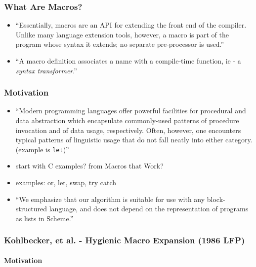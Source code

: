 \documentclass[12pt]{article}	%
\begin{document}
\subsubsection*{What Are Macros?}
\begin{itemize}
	\item ``Essentially, macros are an API for extending the front end of the compiler. Unlike many language extension tools, however, a macro is part of the program whose syntax it extends; no separate pre-processor is used.''~\cite[p1]{Culpepper2010Fortifying}
	\item ``A macro definition associates a name with a compile-time function, ie - a \emph{syntax transformer}.''~\cite[p1]{Culpepper2010Fortifying}
\end{itemize}

\subsubsection*{Motivation}
\begin{itemize}
	\item ``Modern programming languages offer powerful facilities for procedural and data abstraction which encapsulate commonly-used patterns of procedure invocation and of data usage, respectively. Often, however, one encounters typical patterns of linguistic usage that do not fall neatly into either category. (example is \verb!let!)''~\cite[p77]{Kohlbecker1987Macrobyexample}
	\item start with C examples? from Macros that Work?~\cite{Clinger1991Macros}
	\item examples: or, let, swap, try catch
	\item ``We emphasize that our algorithm is suitable for use with any block-structured language, and does not depend on the representation of programs as lists in Scheme.''~\cite[p161]{Clinger1991Macros}
	\end{itemize}


\subsubsection*{Kohlbecker, et al. - Hygienic Macro Expansion (1986 LFP)}

\paragraph{Motivation}
\end{document}
